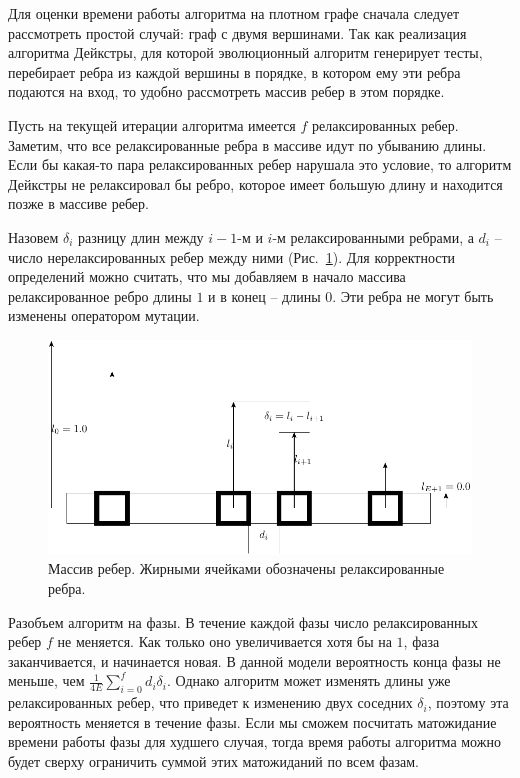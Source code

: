 \documentclass{spisok-article}
\begin{document}
Для оценки времени работы алгоритма на плотном графе сначала следует рассмотреть простой случай: граф с двумя вершинами. Так как реализация алгоритма Дейкстры, для которой эволюционный алгоритм генерирует тесты, перебирает ребра из каждой вершины в порядке, в котором ему эти ребра подаются на вход, то удобно рассмотреть массив ребер в этом порядке.

Пусть на текущей итерации алгоритма имеется $f$ релаксированных ребер. Заметим, что все релаксированные ребра в массиве идут по убыванию длины. Если бы какая-то пара релаксированных ребер нарушала это условие, то алгоритм Дейкстры не релаксировал бы ребро, которое имеет большую длину и находится позже в массиве ребер.

Назовем $\delta_i$ разницу длин между $i-1$-м и $i$-м релаксированными ребрами, а $d_i$ -- число нерелаксированных ребер между ними (Рис.~\ref{edges_array}). Для корректности определений можно считать, что мы добавляем в начало массива релаксированное ребро длины $1$ и в конец -- длины $0$. Эти ребра не могут быть изменены оператором мутации.

\begin{figure}[h]
\begin{center}
\includegraphics[width=\textwidth]{pic/edges.pdf}
\end{center}
\caption{Массив ребер. Жирными ячейками обозначены релаксированные ребра.}\label{edges_array}
\end{figure}

Разобъем алгоритм на фазы. В течение каждой фазы число релаксированных ребер $f$ не меняется. Как только оно увеличивается хотя бы на $1$, фаза заканчивается, и начинается новая. В данной модели вероятность конца фазы не меньше, чем $\frac{1}{4E} \sum_{i = 0}^f d_i \delta_i$. Однако алгоритм может изменять длины уже релаксированных ребер, что приведет к изменению двух соседних $\delta_i$, поэтому эта вероятность меняется в течение фазы. Если мы сможем посчитать матожидание времени работы фазы для худшего случая, тогда время работы алгоритма можно будет сверху ограничить суммой этих матожиданий по всем фазам.
\end{document}
